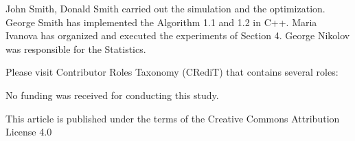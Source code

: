 \documentclass{wseas}
\begin{document}
\flushleft {}
\par{
  \noindent 
  {John Smith, Donald Smith carried out the simulation and the optimization.  }\break
  George Smith has implemented the Algorithm 1.1 and 1.2 in C++.  \break
  Maria Ivanova has organized and executed the experiments of Section 4.  \break
  George Nikolov was responsible for the Statistics.  \break

  \noindent Please visit Contributor Roles Taxonomy (CRediT) that contains several roles:
  \href{www.wseas.org/multimedia/contributor-roleinstruction.pdf}{\color{blue}{www.wseas.org/multimedia/contributor-roleinstruction.pdf}}

  \flushleft {}


  \par { \noindent No funding was received for conducting this study.}
  \break

  \flushleft {}

}
\par  {}


\flushleft {}

\par { \noindent This article is published under the terms of the Creative Commons Attribution License 4.0\\
\href{https://creativecommons.org/licenses/by/4.0/deed.en\_US}{\color{blue}{https://creativecommons.org/licenses/by/4.0/deed.en\break\_US}} }
\end{document}
